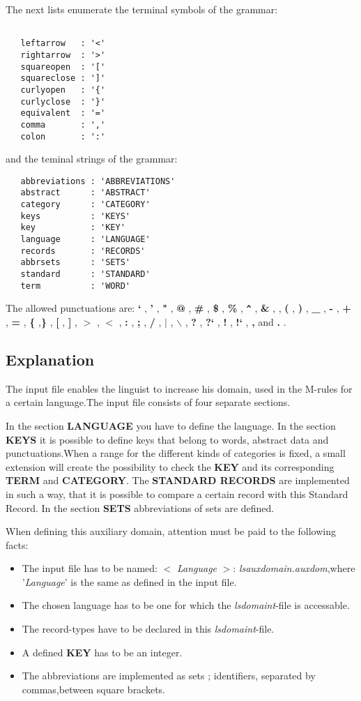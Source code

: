 The next lists enumerate the terminal symbols of the grammar:
\begin{verbatim}

   leftarrow   : '<'
   rightarrow  : '>'
   squareopen  : '['
   squareclose : ']'
   curlyopen   : '{'
   curlyclose  : '}'
   equivalent  : '='
   comma       : ','
   colon       : ':'
\end{verbatim}
and the teminal strings of the grammar:
\begin{verbatim}
   abbreviations : 'ABBREVIATIONS'
   abstract      : 'ABSTRACT'
   category      : 'CATEGORY'
   keys          : 'KEYS'
   key           : 'KEY'
   language      : 'LANGUAGE'
   records       : 'RECORDS'
   abbrsets      : 'SETS'
   standard      : 'STANDARD'
   term          : 'WORD'
\end{verbatim}
The allowed punctuations are:
{\bf `} , {\bf '} , {\bf "} , {\bf @} , {\bf \#} , {\bf \$} , {\bf \%} ,
 {\bf \verb+^+} , {\bf \&} , {\bf *} , {\bf (} , {\bf )} , {\bf \_} ,
 {\bf -} , {\bf +} , {\bf =} , {\bf \{} ,{\bf \}} , {\bf [} , {\bf ]} ,
 {\bf $>$} , {\bf $<$} , {\bf :} , {\bf ;} , {\bf /} , {\bf $|$} ,
 {\bf $\backslash$} , {\bf ?} , {\bf ?`} , {\bf !} , {\bf !`} , {\bf ,}
 and {\bf .} .

\subsection{Explanation}
The input file enables the linguist to increase his domain, used in the
M-rules for a certain language.The input file consists of four separate
sections.

In the section {\bf LANGUAGE} you have to define the language.
In the section {\bf KEYS} it is possible to define keys that belong to words,
abstract data and punctuations.When a range for the different kinds of
categories is fixed, a small extension will create the possibility to check
the {\bf KEY} and its corresponding {\bf TERM} and {\bf CATEGORY}.
The {\bf STANDARD RECORDS} are implemented in such a way, that it is
possible to compare a certain record with this Standard Record.
In the section {\bf SETS} abbreviations of sets are defined.

When defining this auxiliary domain, attention must be paid to the following
facts:
\begin{itemize}
\item The input file has to be named: $<$ {\em Language} $>$:
{\em lsauxdomain.auxdom},where '{\em Language}' is the same as defined in
the input file.
\item The chosen language has to be one for which the {\em lsdomaint}-file is
accessable.
\item The record-types have to be declared in this {\em lsdomaint}-file.
\item A defined {\bf KEY} has to be an integer.
\item The abbreviations are implemented as sets ; identifiers, separated by
commas,between square brackets.
\end{itemize}
